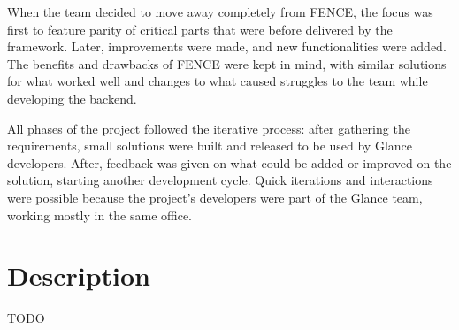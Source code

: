 When the team decided to move away completely from FENCE, the focus was first to feature parity of critical parts that were before delivered by the framework. Later, improvements were made, and new functionalities were added. The benefits and drawbacks of FENCE were kept in mind, with similar solutions for what worked well and changes to what caused struggles to the team while developing the backend. 

All phases of the project followed the iterative process: after gathering the requirements, small solutions were built and released to be used by Glance developers. After, feedback was given on what could be added or improved on the solution, starting another development cycle. Quick iterations and interactions were possible because the project’s developers were part of the Glance team, working mostly in the same office. 


\section{Description}

TODO